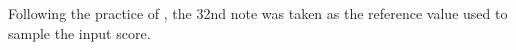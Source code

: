 
Following the practice of \textcite{micchi2020not}, the 32nd
note was taken as the reference value used to sample the input score.
